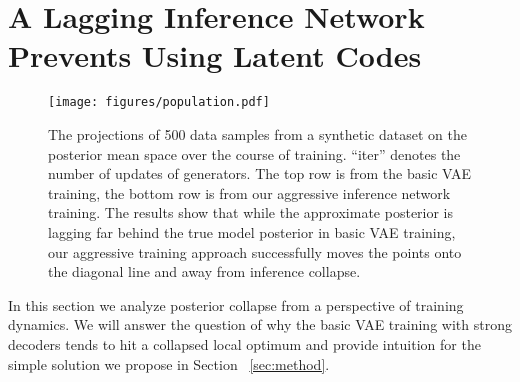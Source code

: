 \documentclass{article} \usepackage{iclr2019_conference,times}
\begin{document}
\section{A Lagging Inference Network Prevents Using Latent Codes}
\label{sec:lag}
\begin{figure}[!t]
\centering
	 \texttt{[image: figures/population.pdf]}
	 \vspace{-15pt}
	 \caption{The projections of 500 data samples from a synthetic dataset on the posterior mean space over the course of training. ``iter'' denotes the number of updates of generators. The top row is from the basic VAE training, the bottom row is from our aggressive inference network training. The results show that while the approximate posterior is lagging far behind the true model posterior in basic VAE training, our aggressive training approach successfully moves the points onto the diagonal line and away from inference collapse.}
	\label{fig:aggre-traj}
	\vspace{-10pt}
\end{figure}
In this section we analyze posterior collapse from a perspective of training dynamics. We will answer the question of why the basic VAE training with strong decoders tends to hit a collapsed local optimum and provide intuition for the simple solution we propose in Section ~\ref{sec:method}.
\end{document}

